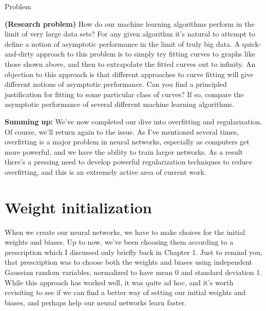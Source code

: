 \documentclass[a4paper,twoside,10pt]{book}
\begin{document}
\begin{exercize}{Problem}
	\item \textbf{(Research problem)} How do our machine learning algorithms perform in the limit of very large data sets? For any given algorithm it's natural to attempt to define a notion of asymptotic performance in the limit of truly big data. A quick-and-dirty approach to this problem is to simply try fitting curves to graphs like those shown above, and then to extrapolate the fitted curves out to infinity. An objection to this approach is that different approaches to curve fitting will give different notions of asymptotic performance. Can you find a principled justification for fitting to some particular class of curves? If so, compare the asymptotic performance of several different machine learning algorithms.
\end{exercize}
\textbf{Summing up:} We've now completed our dive into overfitting and regularization. Of course, we'll return again to the issue. As I've mentioned several times, overfitting is a major problem in neural networks, especially as computers get more powerful, and we have the ability to train larger networks. As a result there's a pressing need to develop powerful regularization techniques to reduce overfitting, and this is an extremely active area of current work.

\section{Weight initialization}
When we create our neural networks, we have to make choices for the initial weights and biases. Up to now, we've been choosing them according to a prescription which I discussed only briefly back in Chapter 1. Just to remind you, that prescription was to choose both the weights and biases using independent Gaussian random variables, normalized to have mean 0 and standard deviation 1. While this approach has worked well, it was quite ad hoc, and it's worth revisiting to see if we can find a better way of setting our initial weights and biases, and perhaps help our neural networks learn faster.
\end{document}
